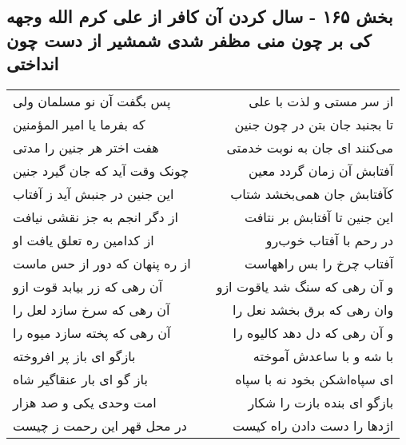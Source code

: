 \begin{center}
\section*{بخش ۱۶۵ - سال کردن آن کافر از علی کرم الله وجهه کی بر چون منی مظفر شدی شمشیر از دست چون انداختی}
\label{sec:sh165}
\begin{longtable}{l p{0.5cm} r}
پس بگفت آن نو مسلمان ولی
&&
از سر مستی و لذت با علی
\\
که بفرما یا امیر المؤمنین
&&
تا بجنبد جان بتن در چون جنین
\\
هفت اختر هر جنین را مدتی
&&
می‌کنند ای جان به نوبت خدمتی
\\
چونک وقت آید که جان گیرد جنین
&&
آفتابش آن زمان گردد معین
\\
این جنین در جنبش آید ز آفتاب
&&
کآفتابش جان همی‌بخشد شتاب
\\
از دگر انجم به جز نقشی نیافت
&&
این جنین تا آفتابش بر نتافت
\\
از کدامین ره تعلق یافت او
&&
در رحم با آفتاب خوب‌رو
\\
از ره پنهان که دور از حس ماست
&&
آفتاب چرخ را بس راههاست
\\
آن رهی که زر بیابد قوت ازو
&&
و آن رهی که سنگ شد یاقوت ازو
\\
آن رهی که سرخ سازد لعل را
&&
وان رهی که برق بخشد نعل را
\\
آن رهی که پخته سازد میوه را
&&
و آن رهی که دل دهد کالیوه را
\\
بازگو ای باز پر افروخته
&&
با شه و با ساعدش آموخته
\\
باز گو ای بار عنقاگیر شاه
&&
ای سپاه‌اشکن بخود نه با سپاه
\\
امت وحدی یکی و صد هزار
&&
بازگو ای بنده بازت را شکار
\\
در محل قهر این رحمت ز چیست
&&
اژدها را دست دادن راه کیست
\\
\end{longtable}
\end{center}
